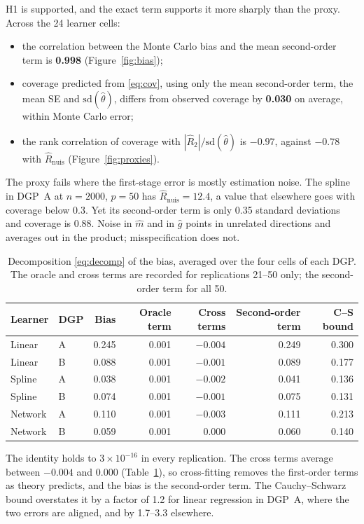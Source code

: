 \documentclass[11pt,a4paper]{article}
\newcommand{\Rnuis}{\hat R_{\mathrm{nuis}}}
\begin{document}
H1 is supported, and the exact term supports it more sharply than the proxy. Across the 24 learner cells:
\begin{itemize}
\item the correlation between the Monte Carlo bias and the mean second-order term is \textbf{0.998} (Figure~\ref{fig:bias});
\item coverage predicted from \eqref{eq:cov}, using only the mean second-order term, the mean SE and $\mathrm{sd}(\hat\theta)$, differs from observed coverage by \textbf{0.030} on average, within Monte Carlo error;
\item the rank correlation of coverage with $|\hat R_2|/\mathrm{sd}(\hat\theta)$ is \textbf{$-0.97$}, against \textbf{$-0.78$} with $\Rnuis$ (Figure~\ref{fig:proxies}).
\end{itemize}

The proxy fails where the first-stage error is mostly estimation noise. The spline in DGP~A at $n=2000$, $p=50$ has $\Rnuis=12.4$, a value that elsewhere goes with coverage below 0.3. Yet its second-order term is only 0.35 standard deviations and coverage is 0.88. Noise in $\hat m$ and in $\hat g$ points in unrelated directions and averages out in the product; misspecification does not.

\begin{table}[t]
\centering\small
\caption{Decomposition \eqref{eq:decomp} of the bias, averaged over the four cells of each DGP. The oracle and cross terms are recorded for replications 21--50 only; the second-order term for all 50.}\label{tab:decomp}
\begin{tabular}{llrrrrr}
\toprule
Learner & DGP & Bias & Oracle term & Cross terms & Second-order term & C--S bound\\
\midrule
Linear & A & 0.245 & 0.001 & $-0.004$ & 0.249 & 0.300\\
Linear & B & 0.088 & 0.001 & $-0.001$ & 0.089 & 0.177\\
Spline & A & 0.038 & 0.001 & $-0.002$ & 0.041 & 0.136\\
Spline & B & 0.074 & 0.001 & $-0.001$ & 0.075 & 0.131\\
Network & A & 0.110 & 0.001 & $-0.003$ & 0.111 & 0.213\\
Network & B & 0.059 & 0.001 & 0.000 & 0.060 & 0.140\\
\bottomrule
\end{tabular}
\end{table}

The identity holds to $3\times10^{-16}$ in every replication. The cross terms average between $-0.004$ and 0.000 (Table~\ref{tab:decomp}), so cross-fitting removes the first-order terms as theory predicts, and the bias is the second-order term. The Cauchy--Schwarz bound overstates it by a factor of 1.2 for linear regression in DGP~A, where the two errors are aligned, and by 1.7--3.3 elsewhere.
\end{document}
